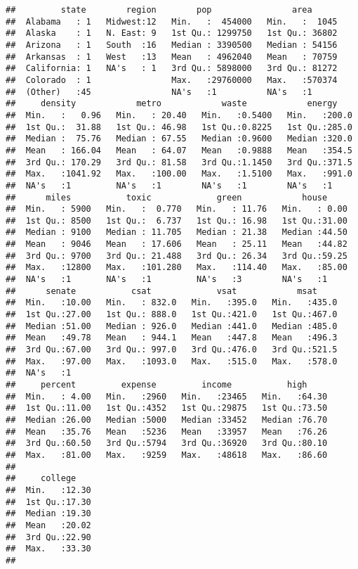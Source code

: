 \documentclass[]{article}
\begin{document}
\begin{verbatim}
##         state        region        pop                area       
##  Alabama   : 1   Midwest:12   Min.   :  454000   Min.   :  1045  
##  Alaska    : 1   N. East: 9   1st Qu.: 1299750   1st Qu.: 36802  
##  Arizona   : 1   South  :16   Median : 3390500   Median : 54156  
##  Arkansas  : 1   West   :13   Mean   : 4962040   Mean   : 70759  
##  California: 1   NA's   : 1   3rd Qu.: 5898000   3rd Qu.: 81272  
##  Colorado  : 1                Max.   :29760000   Max.   :570374  
##  (Other)   :45                NA's   :1          NA's   :1       
##     density            metro            waste            energy     
##  Min.   :   0.96   Min.   : 20.40   Min.   :0.5400   Min.   :200.0  
##  1st Qu.:  31.88   1st Qu.: 46.98   1st Qu.:0.8225   1st Qu.:285.0  
##  Median :  75.76   Median : 67.55   Median :0.9600   Median :320.0  
##  Mean   : 166.04   Mean   : 64.07   Mean   :0.9888   Mean   :354.5  
##  3rd Qu.: 170.29   3rd Qu.: 81.58   3rd Qu.:1.1450   3rd Qu.:371.5  
##  Max.   :1041.92   Max.   :100.00   Max.   :1.5100   Max.   :991.0  
##  NA's   :1         NA's   :1        NA's   :1        NA's   :1      
##      miles           toxic             green            house      
##  Min.   : 5900   Min.   :  0.770   Min.   : 11.76   Min.   : 0.00  
##  1st Qu.: 8500   1st Qu.:  6.737   1st Qu.: 16.98   1st Qu.:31.00  
##  Median : 9100   Median : 11.705   Median : 21.38   Median :44.50  
##  Mean   : 9046   Mean   : 17.606   Mean   : 25.11   Mean   :44.82  
##  3rd Qu.: 9700   3rd Qu.: 21.488   3rd Qu.: 26.34   3rd Qu.:59.25  
##  Max.   :12800   Max.   :101.280   Max.   :114.40   Max.   :85.00  
##  NA's   :1       NA's   :1         NA's   :3        NA's   :1      
##      senate           csat             vsat            msat      
##  Min.   :10.00   Min.   : 832.0   Min.   :395.0   Min.   :435.0  
##  1st Qu.:27.00   1st Qu.: 888.0   1st Qu.:421.0   1st Qu.:467.0  
##  Median :51.00   Median : 926.0   Median :441.0   Median :485.0  
##  Mean   :49.78   Mean   : 944.1   Mean   :447.8   Mean   :496.3  
##  3rd Qu.:67.00   3rd Qu.: 997.0   3rd Qu.:476.0   3rd Qu.:521.5  
##  Max.   :97.00   Max.   :1093.0   Max.   :515.0   Max.   :578.0  
##  NA's   :1                                                       
##     percent         expense         income           high      
##  Min.   : 4.00   Min.   :2960   Min.   :23465   Min.   :64.30  
##  1st Qu.:11.00   1st Qu.:4352   1st Qu.:29875   1st Qu.:73.50  
##  Median :26.00   Median :5000   Median :33452   Median :76.70  
##  Mean   :35.76   Mean   :5236   Mean   :33957   Mean   :76.26  
##  3rd Qu.:60.50   3rd Qu.:5794   3rd Qu.:36920   3rd Qu.:80.10  
##  Max.   :81.00   Max.   :9259   Max.   :48618   Max.   :86.60  
##                                                                
##     college     
##  Min.   :12.30  
##  1st Qu.:17.30  
##  Median :19.30  
##  Mean   :20.02  
##  3rd Qu.:22.90  
##  Max.   :33.30  
## 
\end{verbatim}
\end{document}
